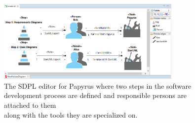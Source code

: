 \begin{figure}[h]
	\vspace*{-5mm}
	
	\vspace*{-5mm}
\end{figure}


\begin{figure}[t]
	\centering
	\includegraphics[width=0.8\textwidth]{images/sdplEditor.png}
	\caption[]{The SDPL editor for Papyrus where two steps in the software 
		development process are defined and responsible persons are attached to 
		them\\ along with the tools they are specialized on.}
	\label{fig:sdplEditor}
	
\end{figure}